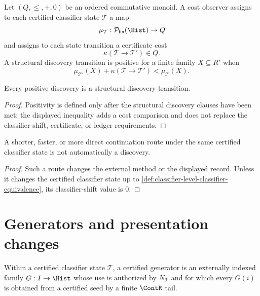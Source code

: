 \begin{definition}
\label{def:classifier-level-positive-discovery}
Let $(Q,\leq,+,0)$ be an ordered commutative monoid. A cost observer assigns to
each certified classifier state $\mathcal T$ a map
$$
\mu_{\mathcal T}:\mathcal P_{\mathsf{fin}}(\Hist)\to Q
$$
and assigns to each state transition a certificate cost
$$
\kappa(\mathcal T\to\mathcal T')\in Q.
$$
A structural discovery transition is positive for a finite family
$X\subseteq R'$ when
$$
\mu_{\mathcal T'}(X)+\kappa(\mathcal T\to\mathcal T')
<
\mu_{\mathcal T}(X).
$$
\end{definition}

\begin{theorem}
\label{thm:positive-discovery-implies-structural-discovery}
Every positive discovery is a structural discovery transition.
\end{theorem}
\begin{proof}
Positivity is defined only after the structural discovery clauses have been
met; the displayed inequality adds a cost comparison and does not replace the
classifier-shift, certificate, or ledger requirements.
\end{proof}

\begin{corollary}
\label{cor:faster-unfolding-is-not-automatically-discovery}
A shorter, faster, or more direct continuation route under the same certified
classifier state is not automatically a discovery.
\end{corollary}
\begin{proof}
Such a route changes the external method or the displayed record. Unless it
changes the certified classifier state up to
\autoref{def:classifier-level-classifier-equivalence}, its classifier-shift
value is $0$.
\end{proof}

\section{Generators and presentation changes}
\label{sec:classifier-level-information-generators}

\begin{definition}
\label{def:classifier-level-certified-generator}
Within a certified classifier state $\mathcal T$, a certified generator is an
externally indexed family $G:I\to\Hist$ whose use is authorized by
$N_{\mathcal T}$ and for which every $G(i)$ is obtained from a certified seed by
a finite $\ContR$ tail.
\end{definition}

